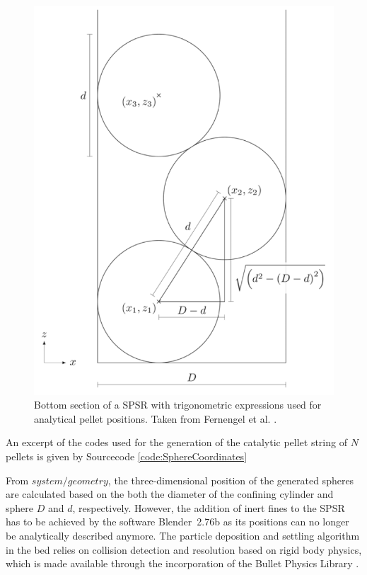 \begin{figure} [ht]
	\centering
	\includegraphics[width=0.75\linewidth]{Figures/visualisation/JohannaSPSRDiagram.PNG}
	\caption[Bottom section of a SPSR with trigonometric expressions used for analytical pellet positions.]{Bottom section of a SPSR with trigonometric expressions used for analytical pellet positions. Taken from Fernengel et al. \cite{Fernengel2020} .}
	\label{fig:JohannaSPSRDiagram}
\end{figure}

An excerpt of the codes used for the generation of the catalytic pellet string of $N$ pellets is given by Sourcecode \ref{code:SphereCoordinates}

\newpage
 \label{code:SphereCoordinates}

From $system/geometry$, the three-dimensional position of the generated spheres are calculated based on the both the diameter of the confining cylinder and sphere $D$ and $d$, respectively. However, the addition of inert fines to the SPSR has to be achieved by the software Blender\texttrademark\ 2.76b \cite{Blender2.76b} as its positions can no longer be analytically described anymore. The particle deposition and settling algorithm in the bed relies on collision detection and resolution based on rigid body physics, which is made available through the incorporation of the Bullet Physics Library \cite{Coumans2012}.

